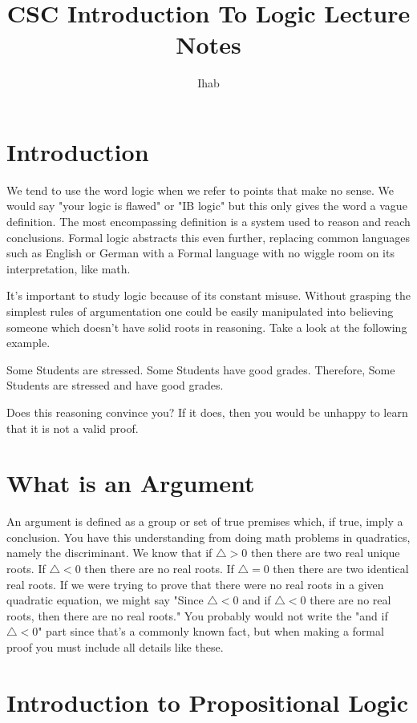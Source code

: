 \documentclass[12pt,letterpaper]{article}
\author{Ihab}
\title{CSC Introduction To Logic Lecture Notes}
\begin{document}
\maketitle
\tableofcontents
\newpage
\section{Introduction}
We tend to use the word logic when we refer to points that make no sense.  We would say "your logic is flawed" or "IB logic" but this only gives the word a vague definition.  The most encompassing definition is a system used to reason and reach conclusions.  Formal logic abstracts this even further, replacing common languages such as English or German with a Formal language with no wiggle room on its interpretation, like math.

It's important to study logic because of its constant misuse.  Without grasping the simplest rules of argumentation one could be easily manipulated into believing someone which doesn't have solid roots in reasoning.  Take a look at the following example.

Some Students are stressed.
Some Students have good grades.
Therefore, Some Students are stressed and have good grades.

Does this reasoning convince you?  If it does, then you would be unhappy to learn that it is not a valid proof.

\section{What is an Argument}
An argument is defined as a group or set of true premises which, if true, imply a conclusion.  You have this understanding from doing math problems in quadratics, namely the discriminant.  We know that if $\bigtriangleup > 0$ then there are two real unique roots.  If $\bigtriangleup < 0$ then there are no real roots.  If $\bigtriangleup = 0$ then there are two identical real roots.  If we were trying to prove that there were no real roots in a given quadratic equation, we might say "Since $\bigtriangleup < 0$ and if $\bigtriangleup < 0$ there are no real roots, then there are no real roots."  You probably would not write the "and if $\bigtriangleup < 0$" part since that's a commonly known fact, but when making a formal proof you must include all details like these.

\section{Introduction to Propositional Logic}
\end{document}
